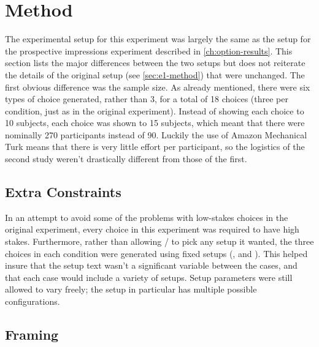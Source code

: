 \section{Method}

The experimental setup for this experiment was largely the same as the setup for the prospective impressions experiment described in \cref{ch:option-results}.
%
This section lists the major differences between the two setups but does not reiterate the details of the original setup (see \cref{sec:e1-method}) that were unchanged.
%
The first obvious difference was the sample size.
%
As already mentioned, there were six types of choice generated, rather than 3, for a total of 18 choices (three per condition, just as in the original experiment).
%
Instead of showing each choice to 10 subjects, each choice was shown to 15 subjects, which meant that there were nominally 270 participants instead of 90.
%
Luckily the use of Amazon Mechanical Turk means that there is very little effort per participant, so the logistics of the second study weren't drastically different from those of the first.


\subsection{Extra Constraints}

In an attempt to avoid some of the problems with low-stakes choices in the original experiment, every choice in this experiment was required to have high stakes.
%
Furthermore, rather than allowing \dunyazad/ to pick any setup it wanted, the three choices in each condition were generated using fixed setups (,  and ).
%
This helped insure that the setup text wasn't a significant variable between the cases, and that each case would include a variety of setups.
%
Setup parameters were still allowed to vary freely; the  setup in particular has multiple possible configurations.


\subsection{Framing}

